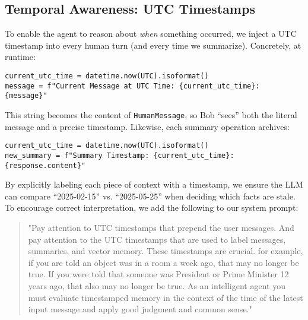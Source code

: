 \documentclass[11pt]{article}
\begin{document}
\subsection{Temporal Awareness: UTC Timestamps}
To enable the agent to reason about \emph{when} something occurred, we inject a UTC timestamp into every human turn (and every time we summarize). Concretely, at runtime:
\begin{verbatim}
current_utc_time = datetime.now(UTC).isoformat()
message = f"Current Message at UTC Time: {current_utc_time}: {message}"
\end{verbatim}
This string becomes the content of \texttt{HumanMessage}, so Bob “sees” both the 
literal message and a precise timestamp. Likewise, each summary operation archives:
\begin{verbatim}
current_utc_time = datetime.now(UTC).isoformat()
new_summary = f"Summary Timestamp: {current_utc_time}: {response.content}"
\end{verbatim}
By explicitly labeling each piece of context with a timestamp, 
we ensure the LLM can compare “2025-02-15” vs. “2025-05-25” 
when deciding which facts are stale. To encourage correct interpretation, 
we add the following to our system prompt:
\begin{quote}
  "Pay attention to UTC timestamps that prepend the user messages.  And pay attention to the UTC timestamps that are used to label messages, summaries, and vector memory.  These timestamps are crucial.  for example, if you are told an object was in a room a week ago, that may no longer be true.  If you were told that someone was President or Prime Minister 12 years ago, that also may no longer be true.  As an intelligent agent you must evaluate timestamped memory in the context of the time of the latest input message and apply good judgment and common sense."
\end{quote}
\end{document}
